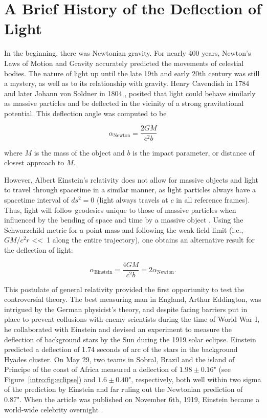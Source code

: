 \section{A Brief History of the Deflection of Light}

In the beginning, there was Newtonian gravity. For nearly 400 years, Newton's Laws of Motion and Gravity accurately predicted the movements of celestial bodies. The nature of light up until the late 19th and early 20th century was still a mystery, as well as to its relationship with gravity. Henry Cavendish in 1784 \citep{Cavendish:2011ts} and later Johann von Soldner in 1804 \citep{Jaki:1978wc}, posited that light could behave similarly as massive particles and be deflected in the vicinity of a strong gravitational potential. This deflection angle was computed to be

\begin{equation}
\alpha_\mathrm{Newton} = \frac{2GM}{c^2b}
\end{equation}

\noindent where $M$ is the mass of the object and $b$ is the impact parameter, or distance of closest approach to $M$.

However, Albert Einstein's relativity does not allow for massive objects and light to travel through spacetime in a similar manner, as light particles always have a spacetime interval of $ds^2=0$ (light always travels at $c$ in all reference frames). Thus, light will follow geodesics unique to those of massive particles when influenced by the bending of space and time by a massive object \citep{Einstein:1911rf}. Using the Schwarzchild metric for a point mass and following the weak field limit (i.e., $GM/c^2r$ \textless \textless\ 1 along the entire trajectory), one obtains an alternative result for the deflection of light:

\begin{equation}
\alpha_\mathrm{Einstein} = \frac{4GM}{c^2b} =  2\alpha_\mathrm{Newton}.
\label{intro:eqn:deflection}
\end{equation}

This postulate of general relativity provided the first opportunity to test the controversial theory. The best measuring man in England, Arthur Eddington, was intrigued by the German physicist's theory, and despite facing barriers put in place to prevent collusions with enemy scientists during the time of World War I, he collaborated with Einstein and devised an experiment to measure the deflection of background stars by the Sun during the 1919 solar eclipse. Einstein predicted a deflection of 1.74 seconds of arc of the stars in the background Hyades cluster. On May 29, two teams in Sobral, Brazil and the island of Principe of the coast of Africa measured a deflection of $1.98\pm0.16$" (see Figure~\ref{intro:fig:eclipse}) and $1.6\pm0.40$", respectively, both well within two sigma of the prediction by Einstein and far ruling out the Newtonian prediction of 0.87". When the article was published on November 6th, 1919, Einstein became a world-wide celebrity overnight \citep{Dyson:1920zl}.


